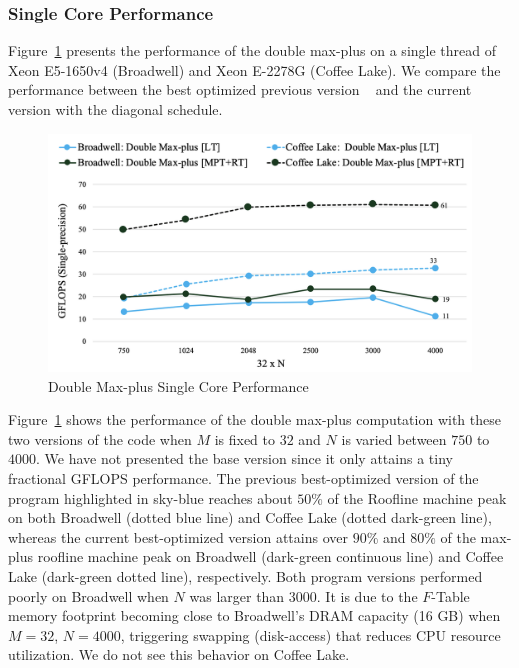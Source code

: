 \subsubsection{Single Core Performance}
Figure~\ref{fig:st_performance_analysis_double_max_plus} presents the performance of the double max-plus on a single thread of Xeon E5-1650v4 (Broadwell) and Xeon E-2278G (Coffee Lake). We compare the performance between the best optimized previous version ~\cite{Mondal2021} and the current version with the diagonal schedule.
\begin{figure}[htbp]
\centerline{\includegraphics[scale=0.38, trim=5 5 5 5,clip]{content/figures/dpm_single_core_new.png}}
\caption{Double Max-plus Single Core Performance}
\label{fig:st_performance_analysis_double_max_plus}
\end{figure}
Figure~\ref{fig:st_performance_analysis_double_max_plus} shows the performance of the double max-plus computation with these two versions of the code when $M$ is fixed to $32$ and $N$ is varied between $750$ to $4000$. We have not presented the base version since it only attains a tiny fractional GFLOPS performance. The previous best-optimized version of the program highlighted in sky-blue reaches about $50\%$ of the Roofline machine peak on both Broadwell (dotted blue line) and Coffee Lake (dotted dark-green line), whereas the current best-optimized version attains over $90\%$ and $80\%$ of the max-plus roofline machine peak on Broadwell (dark-green continuous line) and Coffee Lake (dark-green dotted line), respectively. Both program versions performed poorly on Broadwell when $N$ was larger than $3000$. It is due to the $F$-Table memory footprint becoming close to Broadwell's DRAM capacity (16 GB) when $M=32$, $N=4000$, triggering swapping (disk-access) that reduces CPU resource utilization. We do not see this behavior on Coffee Lake.


